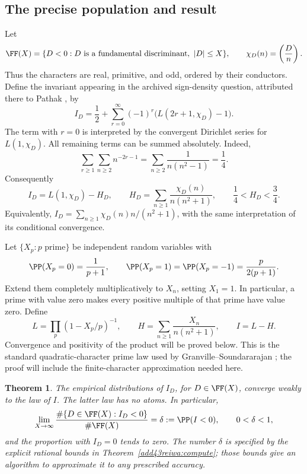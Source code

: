 \documentclass[11pt,a4paper]{article}
\numberwithin{equation}{section}
\newtheorem{theorem}{Theorem}[section]
\theoremstyle{definition}
\theoremstyle{remark}
\begin{document}
\subsection{The precise population and result}
Let
\[
 \FF(X)=\{D<0: D\text{ is a fundamental discriminant},\ |D|\le X\},
 \qquad \chi_D(n)=\left(\frac{D}{n}\right).
\]
Thus the characters are real, primitive, and odd, ordered by their
conductors. Define the invariant appearing in the archived sign-density
question, attributed there to Pathak \cite{add43reiwa:pathak}, by
\begin{equation}\label{add43reiwa:Idef}
 I_D=\frac12+\sum_{r=0}^{\infty}(-1)^r
                   \bigl(L(2r+1,\chi_D)-1\bigr).
\end{equation}
The term with $r=0$ is interpreted by the convergent Dirichlet series
for $L(1,\chi_D)$. All remaining terms can be summed absolutely.
Indeed,
\[
 \sum_{r\ge1}\sum_{n\ge2}n^{-2r-1}
  =\sum_{n\ge2}\frac1{n(n^2-1)}=\frac14.
\]
Consequently
\begin{equation}\label{add43reiwa:Iidentity}
 I_D=L(1,\chi_D)-H_D,\qquad
 H_D=\sum_{n\ge1}\frac{\chi_D(n)}{n(n^2+1)},
 \qquad \frac14<H_D<\frac34.
\end{equation}
Equivalently, $I_D=\sum_{n\ge1}\chi_D(n)n/(n^2+1)$, with the same
interpretation of its conditional convergence.

Let $\{X_p:p\text{ prime}\}$ be independent random variables with
\begin{equation}\label{add43reiwa:primelaw}
 \PP(X_p=0)=\frac1{p+1},\qquad
 \PP(X_p=1)=\PP(X_p=-1)=\frac{p}{2(p+1)}.
\end{equation}
Extend them completely multiplicatively to $X_n$, setting $X_1=1$.
In particular, a prime with value zero makes every positive multiple
of that prime have value zero. Define
\begin{equation}\label{add43reiwa:randomI}
 L=\prod_p(1-X_p/p)^{-1},\qquad
 H=\sum_{n\ge1}\frac{X_n}{n(n^2+1)},\qquad I=L-H.
\end{equation}
Convergence and positivity of the product will be proved below.
This is the standard quadratic-character prime law used by
Granville--Soundararajan \cite{add43reiwa:GS}; the proof will include the
finite-character approximation needed here.

\begin{theorem}\label{add43reiwa:main}
The empirical distributions of $I_D$, for $D\in\FF(X)$, converge
weakly to the law of $I$. The latter law has no atoms. In particular,
\[
 \lim_{X\to\infty}
 \frac{\#\{D\in\FF(X):I_D<0\}}{\#\FF(X)}
       =\delta:=\PP(I<0),\qquad 0<\delta<1,
\]
and the proportion with $I_D=0$ tends to zero. The number $\delta$
is specified by the explicit rational bounds in
Theorem~\ref{add43reiwa:compute}; those bounds give an algorithm to approximate
it to any prescribed accuracy.
\end{theorem}
\end{document}
